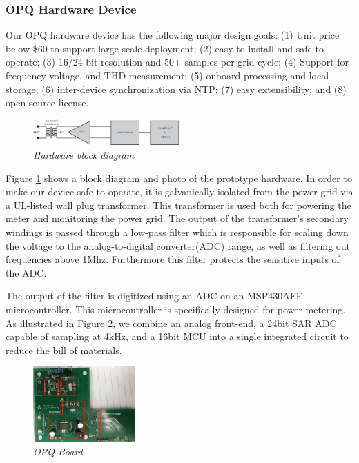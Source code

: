 \subsubsection{OPQ Hardware Device}

Our OPQ hardware device has the following major design goals: (1) Unit price below \$60 to support large-scale deployment; (2) easy to install and safe to operate; (3) 16/24 bit resolution and 50+ samples per grid cycle; (4) Support for frequency voltage, and THD measurement; (5) onboard processing and local storage; (6) inter-device synchronization via NTP; (7) easy extensibility; and (8) open source license. 

\begin{figure}
  \includegraphics[width=0.5\textwidth]{figures/hardware-block-diagram.eps}
  \caption{\em \small Hardware block diagram}
  \label{fig:hardware-block-diagram}
\end{figure} 


Figure \ref{fig:hardware-block-diagram} shows a block diagram and photo of the prototype hardware. In order to make our device safe to operate, it is galvanically isolated from the power grid via a UL-listed wall plug transformer. This transformer is used both for powering the meter and monitoring the power grid. The output of the transformer's secondary windings is passed through a low-pass filter which is responsible for scaling down the voltage to the analog-to-digital converter(ADC) range, as well as filtering out frequencies above 1Mhz. Furthermore this filter protects the sensitive inputs of the ADC.



The output of the filter is digitized using an ADC on an MSP430AFE microcontroller. This microcontroller is specifically designed for power metering. As illustrated in Figure \ref{fig:board}, we combine an analog front-end, a 24bit SAR ADC capable of sampling at 4kHz, and a 16bit MCU into a single integrated circuit to reduce the bill of materials. 

\begin{figure}
  \includegraphics[width=0.35\textwidth]{figures/board3.eps}
  \caption{\em \small OPQ Board}
  \label{fig:board}
\end{figure} 

